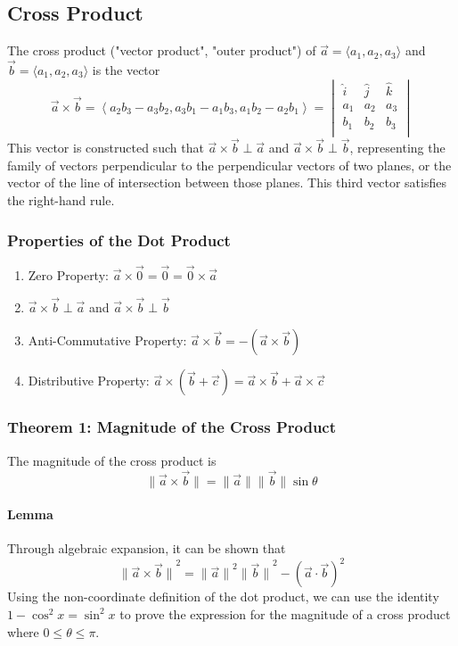 \documentclass{article}
\newcommand{\vect}[1]{\ensuremath{\overrightarrow{#1}}}
\newcommand{\magnitude}[1]{\ensuremath{\lVert #1 \rVert}}
\newcommand{\magvect}[1]{\magnitude{\vect{#1}}}
\begin{document}
\subsection{Cross Product}
The cross product ("vector product", "outer product") of $\vect{a} = \langle a_1, a_2, a_3 \rangle$ and $\vect{b} = \langle a_1, a_2, a_3 \rangle$ is the vector
$$\vect{a} \times \vect{b} = \left\langle a_2b_3 - a_3b_2, a_3b_1 - a_1b_3, a_1b_2 - a_2b_1\right\rangle =
    \begin{vmatrix}
        \hat{i} & \hat{j} & \hat{k} \\
        a_1     & a_2     & a_3     \\
        b_1     & b_2     & b_3     \\
    \end{vmatrix}
$$
This vector is constructed such that $\vect{a} \times \vect{b} \perp \vect{a}$ and $\vect{a} \times \vect{b} \perp \vect{b}$, representing the family of vectors perpendicular to the perpendicular vectors of two planes, or the vector of the line of intersection between those planes. This third vector satisfies the right-hand rule.

\subsubsection{Properties of the Dot Product}
\begin{enumerate}
    \item Zero Property: $\vect{a} \times \vect{0} = \vect{0} = \vect{0} \times \vect{a}$
    \item $\vect{a} \times \vect{b} \perp \vect{a}$ and $\vect{a} \times \vect{b} \perp \vect{b}$
    \item Anti-Commutative Property: $\vect{a} \times \vect{b} = -\left(\vect{a} \times \vect{b}\right)$
    \item Distributive Property: $\vect{a} \times \left(\vect{b} + \vect{c}\right) = \vect{a} \times \vect{b} + \vect{a} \times \vect{c}$
\end{enumerate}
\subsubsection{Theorem 1: Magnitude of the Cross Product}\label{mag-cross-product}
The magnitude of the cross product is
$$\magnitude{\vect{a} \times \vect{b}} = \magvect{a}\magvect{b}\sin{\theta}$$

\paragraph{Lemma} Through algebraic expansion, it can be shown that $$\magnitude{\vect{a} \times \vect{b}}^2 = \magvect{a}^2\magvect{b}^2 - \left(\vect{a} \cdot \vect{b}\right)^2$$
Using the non-coordinate definition of the dot product, we can use the identity $1-\cos^2{x} = \sin^2{x}$ to prove the expression for the magnitude of a cross product where $0 \le \theta \le \pi$.
\end{document}

